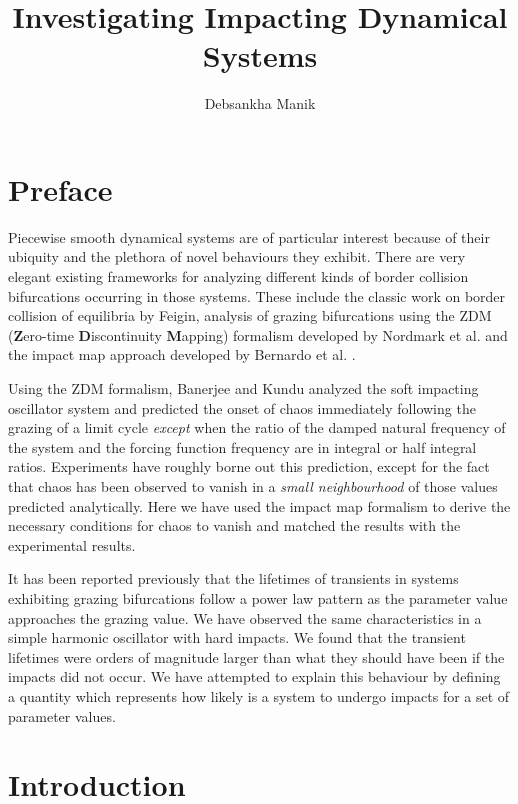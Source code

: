 \documentclass{book}
\renewcommand{\(}{\begin{columns}}
\renewcommand{\)}{\end{columns}}
\newcommand{\<}[1]{\begin{column}{#1}}
\renewcommand{\>}{\end{column}}
\newcommand{\bb}[1]{\textbf{#1}}
\begin{document}
\title{Investigating Impacting Dynamical Systems}
\author{Debsankha Manik}
\maketitle

\frontmatter
\chapter{Preface}
Piecewise smooth dynamical systems are of particular interest because of their 
ubiquity and the plethora of novel behaviours they exhibit.  There are very elegant existing frameworks
for analyzing different kinds of border collision bifurcations occurring in those systems.
These include the classic work on border collision of equilibria by Feigin\cite{feigin-1970}, analysis of grazing 
bifurcations using the ZDM (\bb{Z}ero-time \bb{D}iscontinuity \bb{M}apping) formalism developed by Nordmark et al. \cite{dm-orig-nordmark} and the impact map 
approach developed by Bernardo et al. \cite[p.~10]{bernardo-book}.

Using the ZDM formalism, Banerjee and Kundu analyzed the soft impacting oscillator system
and predicted the onset of chaos immediately following the grazing of a limit 
cycle \emph{except} when the ratio of the damped natural frequency of the 
system and the forcing function frequency are in integral or half integral 
ratios.  Experiments have roughly borne out this prediction, except for the 
fact that chaos has been observed to vanish in a \emph{small neighbourhood} of 
those values predicted analytically.  Here we have used the impact map formalism to 
derive the necessary conditions for chaos to vanish and matched the results with the 
experimental results.  

It has been reported previously that the lifetimes of transients in  systems 
exhibiting grazing bifurcations follow a power law pattern as the parameter 
value approaches the grazing value.  We have observed the same characteristics 
in a simple harmonic oscillator with hard impacts. We found that the transient 
lifetimes were orders of magnitude larger than what they should have been
if the impacts did not occur.   We have attempted to explain this 
behaviour by defining a quantity which represents how likely is a system to 
undergo impacts for a set of parameter values.  

\tableofcontents

\mainmatter
\chapter{Introduction}
\end{document}
